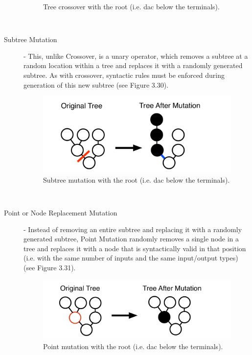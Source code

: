 \documentclass[a4paper,12pt]{report} 	%
\numberwithin{figure}{chapter}
\numberwithin{table}{chapter}
\numberwithin{equation}{chapter}
\begin{document}
\begin{flushleft}
\begin{description}
\begin{figure}[h!]
\begin{center}
\caption[Crossover]{Tree crossover with the root (i.e. dac\texttildelow{} below the terminals).}
\end{center}
\end{figure}
\\
\item[Subtree Mutation] - This, unlike Crossover, is a unary operator, which removes a subtree at a random location within a tree and replaces it with a randomly generated subtree. As with crossover, syntactic rules must be enforced during generation of this new subtree (see Figure 3.30).
\begin{figure}[h!]
\begin{center}
\includegraphics[scale=0.5]{SubtreeMutation}
\caption[Subtree Mutation]{Subtree mutation with the root (i.e. dac\texttildelow{} below the terminals).}
\end{center}
\end{figure}
\\
\item[Point or Node Replacement Mutation] - Instead of removing an entire subtree and replacing it with a randomly generated subtree, Point Mutation randomly removes a single node in a tree and replaces it with a node that is syntactically valid in that position (i.e. with the same number of inputs and the same input/output types) (see Figure 3.31).
\begin{figure}[h!]
\begin{center}
\includegraphics[scale=0.5]{PointMutation}
\caption[Point Mutation]{Point mutation with the root (i.e. dac\texttildelow{} below the terminals).}

\end{center}
\end{figure}
\end{description}
\end{flushleft}
\end{document}
